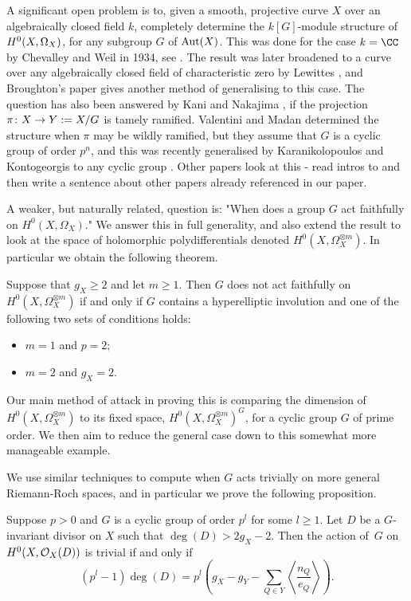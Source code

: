 A significant open problem is to, given a smooth, projective curve $X$ over an algebraically closed field $k$, completely determine the $k[G]$-module structure of ${H^0(X,\Omega_X)}$, for any subgroup $G$ of $\operatorname{Aut}(X)$.
This was done for the case $k = \CC$ by Chevalley and Weil in 1934, see \cite{chev}.
The result was later broadened to a curve over any algebraically closed field of characteristic zero by Lewittes \cite{lewittes}, and Broughton's paper \cite{broughton} gives another method of generalising to this case.
The question has also been answered by Kani \cite{Kani} and Nakajima \cite{naka2}, if the projection $\pi \colon X \rightarrow Y:= X/G$ is tamely ramified.
Valentini and Madan \cite{valmadan} determined the structure when $\pi$ may be wildly ramified, but they assume that $G$ is a cyclic group of order $p^n$, and this was recently generalised by Karanikolopoulos and Kontogeorgis to any cyclic group \cite{kako}.
Other papers look at this - read intros to and then write a sentence about other papers already referenced in our paper.

A weaker, but naturally related, question is: "When does a group $G$ act faithfully on $H^0(X,\Omega_X)$."
We answer this in full generality, and also extend the result to look at the space of holomorphic polydifferentials denoted $H^0(X,\Omega_X^{\otimes m})$.
In particular we obtain the following theorem.
    \begin{unnumthm}
    Suppose that $g_X\geq 2$ and let $m\geq1$. 
    Then $G$ does not act faithfully on $H^0(X,\Omega_X^{\otimes m})$ if and only if $G$ contains a hyperelliptic involution and one of the following two sets of conditions holds:
        \begin{itemize}
        \item $m=1$ and $p=2$;
        \item $m=2$ and $g_X=2$.
        \end{itemize}
    \end{unnumthm}
Our main method of attack in proving this is comparing the dimension of $H^0(X,\Omega_X^{\otimes m})$ to its fixed space, $H^0(X,\Omega_X^{\otimes m})^G$, for a cyclic group $G$ of prime order.
We then aim to reduce the general case down to this somewhat more manageable example.

We use similar techniques to compute when $G$ acts trivially on more general Riemann-Roch spaces, and in particular we prove the following proposition.
    \begin{unnumprop}\label{nakaj}
    Suppose $p>0$ and $G$ is a cyclic group of order $p^l$ for some $l\geq 1$.
    Let $D$ be a $G$-invariant divisor on $X$ such that $\deg(D)>2g_X-2$.
    Then the action of~$G$ on $H^0(X,{\cal O}_X(D))$ is trivial if and only if
        \[ 
        (p^l-1)\deg(D)=p^l\left(g_X-g_Y-\sum_{Q\in Y}\left\langle \frac{n_Q}{e_Q} \right\rangle\right).
        \]
    \end{unnumprop}




